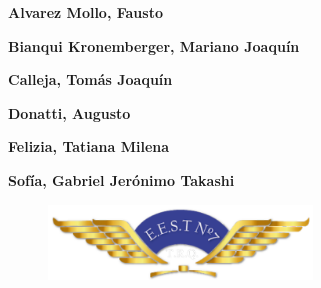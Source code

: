 \documentclass[28pt, a4paper]{report}
\begin{document}
\begin{titlepage}
\begin{center}
            {\Large\textbf{{Alvarez Mollo, Fausto}}}\par
            
            {\Large\textbf{{Bianqui Kronemberger, Mariano Joaquín}}}\par
            
            {\Large\textbf{{Calleja, Tomás Joaquín}}}\par
            
            {\Large\textbf{{Donatti, Augusto}}}\par
            
            {\Large\textbf{{Felizia, Tatiana Milena}}}\par
            
            {\Large\textbf{{Sofía, Gabriel Jerónimo Takashi}}}\par
                \vspace{1.5cm}
                
            \begin{figure} [!ht]
                \centering
                \includegraphics [width=7cm]{Imagenes/Preface/IMPA.png}
                \label{IMPA}
            \end{figure}
            
        \end{center}
        
    \end{titlepage}
    
    \tableofcontents
    \newpage











\end{document}

